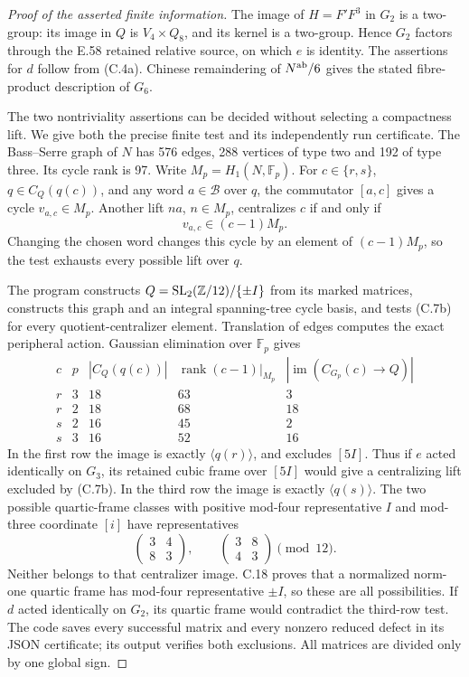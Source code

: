 \begin{proof}[Proof of the asserted finite information]
The image of \(H=F'F^3\) in \(G_2\) is a two-group:
its image in \(Q\) is \(V_4\times Q_8\), and its kernel
is a two-group. Hence \(G_2\) factors through the E.58
retained relative source, on which \(e\) is identity.
The assertions for \(d\) follow from (C.4a).
Chinese remaindering of \(N^{\rm ab}/6\) gives the
stated fibre-product description of \(G_6\).

The two nontriviality assertions can be decided without
selecting a compactness lift. We give both the precise
finite test and its independently run certificate.
The Bass--Serre graph of \(N\) has 576 edges, 288
vertices of type two and 192 of type three. Its cycle
rank is 97. Write \(M_p=H_1(N,\mathbb F_p)\).
For \(c\in\{r,s\}\), \(q\in C_Q(q(c))\), and any
word \(a\in\mathcal B\) over \(q\), the commutator
\([a,c]\) gives a cycle \(v_{a,c}\in M_p\).
Another lift \(na\), \(n\in M_p\), centralizes \(c\)
if and only if
\[
 v_{a,c}\in(c-1)M_p.
 \tag{C.7b}
\]
Changing the chosen word changes this cycle by an
 element of \((c-1)M_p\), so the test exhausts every
possible lift over \(q\).

The program  constructs
\(Q={\rm SL}_2(\mathbb Z/12)/\{\pm I\}\) from its
marked matrices, constructs this graph and an integral
spanning-tree cycle basis, and tests (C.7b) for every
quotient-centralizer element. Translation of edges
computes the exact peripheral action. Gaussian
elimination over \(\mathbb F_p\) gives
\[
\begin{array}{c|r|r|r|r}
 c&p&|C_Q(q(c))|&\operatorname{rank}(c-1)|_{M_p}
      &|\operatorname{im}(C_{G_p}(c)\to Q)|\\ \hline
 r&3&18&63&3\\
 r&2&18&68&18\\
 s&2&16&45&2\\
 s&3&16&52&16
\end{array}
\tag{C.7c}
\]
In the first row the image is exactly \(\langle q(r)\rangle\),
and excludes \([5I]\). Thus if \(e\) acted identically
on \(G_3\), its retained cubic frame over \([5I]\)
would give a centralizing lift excluded by (C.7b).
In the third row the image is exactly \(\langle q(s)\rangle\).
The two possible quartic-frame classes with positive
mod-four representative \(I\) and mod-three coordinate
\([i]\) have representatives
\[
 \begin{pmatrix}3&4\\8&3\end{pmatrix},\qquad
 \begin{pmatrix}3&8\\4&3\end{pmatrix}\pmod {12}.
\]
Neither belongs to that centralizer image. C.18 proves
that a normalized norm-one quartic frame has mod-four
representative \(\pm I\), so these are all possibilities.
If \(d\) acted identically on \(G_2\), its quartic
frame would contradict the third-row test.
The code saves every successful matrix and every
nonzero reduced defect in its JSON certificate;
its output verifies both exclusions. All matrices
are divided only by one global sign.
\end{proof}

